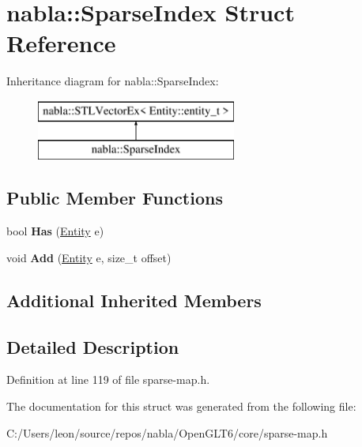 \hypertarget{structnabla_1_1_sparse_index}{}\section{nabla\+::Sparse\+Index Struct Reference}
\label{structnabla_1_1_sparse_index}
Inheritance diagram for nabla\+::Sparse\+Index\+:\begin{figure}[H]
\begin{center}
\leavevmode
\includegraphics[height=2.000000cm]{structnabla_1_1_sparse_index}
\end{center}
\end{figure}
\subsection*{Public Member Functions}
\begin{DoxyCompactItemize}
\item 
\mbox{\label{structnabla_1_1_sparse_index_ac4b3e4d93bfd1c5ed00d8d3d19be7c29}} 
bool {\bfseries Has} (\mbox{\hyperlink{structnabla_1_1_entity}{Entity}} e)
\item 
\mbox{\label{structnabla_1_1_sparse_index_ab426cbabae54e279383424d3ef1fc7e7}} 
void {\bfseries Add} (\mbox{\hyperlink{structnabla_1_1_entity}{Entity}} e, size\+\_\+t offset)
\end{DoxyCompactItemize}
\subsection*{Additional Inherited Members}


\subsection{Detailed Description}


Definition at line 119 of file sparse-\/map.\+h.



The documentation for this struct was generated from the following file\+:\begin{DoxyCompactItemize}
\item 
C\+:/\+Users/leon/source/repos/nabla/\+Open\+G\+L\+T6/core/sparse-\/map.\+h\end{DoxyCompactItemize}
